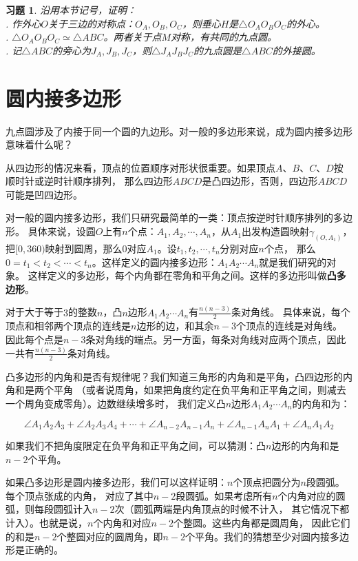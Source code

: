 \documentclass[12pt,UTF8]{ctexbook}
\newtheorem{xt}{习题}[section]
\begin{document}
\begin{xt}
    沿用本节记号，证明：\\
    . 作外心$O$关于三边的对称点：$O_A, O_B, O_C$，则垂心$H$是$\triangle O_AO_BO_C$的外心。\\
    . $\triangle O_AO_BO_C \simeq \triangle ABC$。两者关于点$M$对称，有共同的九点圆。\\
    . 记$\triangle ABC$的旁心为$J_A, J_B, J_C$，则$\triangle J_AJ_BJ_C$的九点圆是$\triangle ABC$的外接圆。
\end{xt}

\section{圆内接多边形}
九点圆涉及了内接于同一个圆的九边形。对一般的多边形来说，成为圆内接多边形意味着什么呢？

从四边形的情况来看，顶点的位置顺序对形状很重要。如果顶点$A$、$B$、$C$、$D$按顺时针或逆时针顺序排列，
那么四边形$ABCD$是凸四边形，否则，四边形$ABCD$可能是凹四边形。

对一般的圆内接多边形，我们只研究最简单的一类：顶点按逆时针顺序排列的多边形。
具体来说，设圆$O$上有$n$个点：$A_1, A_2, \cdots , A_n$，从$A_1$出发构造圆映射$\gamma_{(O,A_1)}$，
把$[0, 360)$映射到圆周，那么$0$对应$A_1$。设$t_1, t_2, \cdots , t_n$分别对应$n$个点，
那么$0 = t_1 < t_2 < \cdots < t_n$。这样定义的圆内接多边形：$A_1A_2\cdots A_n$就是我们研究的对象。
这样定义的多边形，每个内角都在零角和平角之间。这样的多边形叫做\textbf{凸多边形}。

对于大于等于$3$的整数$n$，凸$n$边形$A_1A_2\cdots A_n$有$\frac{n(n-3)}{2}$条对角线。
具体来说，每个顶点和相邻两个顶点的连线是$n$边形的边，和其余$n-3$个顶点的连线是对角线。
因此每个点是$n-3$条对角线的端点。另一方面，每条对角线对应两个顶点，因此一共有$\frac{n(n-3)}{2}$条对角线。

凸多边形的内角和是否有规律呢？我们知道三角形的内角和是平角，凸四边形的内角和是两个平角
（或者说周角，如果把角度约定在负平角和正平角之间，则减去一个周角变成零角）。边数继续增多时，
我们定义凸$n$边形$A_1A_2\cdots A_n$的内角和为：

$$ \angle A_1A_2A_3 + \angle A_2A_3A_4 + \cdots + \angle A_{n-2}A_{n-1}A_{n} + \angle A_{n-1}A_{n}A_{1}+ \angle A_{n}A_{1}A_{2}$$

如果我们不把角度限定在负平角和正平角之间，可以猜测：凸$n$边形的内角和是$n-2$个平角。

如果凸多边形是圆内接多边形，我们可以这样证明：$n$个顶点把圆分为$n$段圆弧。每个顶点张成的内角，
对应了其中$n-2$段圆弧。如果考虑所有$n$个内角对应的圆弧，则每段圆弧计入$n-2$次（圆弧两端是内角顶点的时候不计入，
其它情况下都计入）。也就是说，$n$个内角和对应$n-2$个整圆。这些内角都是圆周角，
因此它们的和是$n-2$个整圆对应的圆周角，即$n-2$个平角。我们的猜想至少对圆内接多边形是正确的。
\end{document}
